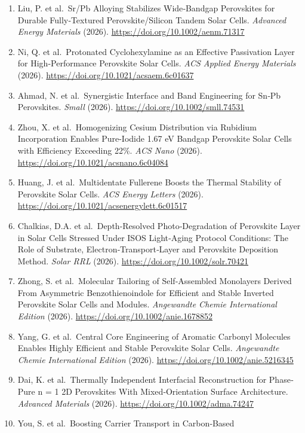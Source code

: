 \documentclass[
  11pt,
]{article}
\begin{document}
\begin{enumerate}
  \url{https://doi.org/10.1002/anie.7827890}
\item
  Liu, P. et al.~Sr/Pb Alloying Stabilizes Wide‐Bandgap Perovskites for
  Durable Fully‐Textured Perovskite/Silicon Tandem Solar Cells.
  \emph{Advanced Energy Materials} (2026).
  \url{https://doi.org/10.1002/aenm.71317}
\item
  Ni, Q. et al.~Protonated Cyclohexylamine as an Effective Passivation
  Layer for High-Performance Perovskite Solar Cells. \emph{ACS Applied
  Energy Materials} (2026). \url{https://doi.org/10.1021/acsaem.6c01637}
\item
  Ahmad, N. et al.~Synergistic Interface and Band Engineering for Sn‐Pb
  Perovskites. \emph{Small} (2026).
  \url{https://doi.org/10.1002/smll.74531}
\item
  Zhou, X. et al.~Homogenizing Cesium Distribution via Rubidium
  Incorporation Enables Pure-Iodide 1.67 eV Bandgap Perovskite Solar
  Cells with Efficiency Exceeding 22\%. \emph{ACS Nano} (2026).
  \url{https://doi.org/10.1021/acsnano.6c04084}
\item
  Huang, J. et al.~Multidentate Fullerene Boosts the Thermal Stability
  of Perovskite Solar Cells. \emph{ACS Energy Letters} (2026).
  \url{https://doi.org/10.1021/acsenergylett.6c01517}
\item
  Chalkias, D.A. et al.~Depth‐Resolved Photo‐Degradation of Perovskite
  Layer in Solar Cells Stressed Under ISOS Light‐Aging Protocol
  Conditions: The Role of Substrate, Electron‐Transport‐Layer and
  Perovskite Deposition Method. \emph{Solar RRL} (2026).
  \url{https://doi.org/10.1002/solr.70421}
\item
  Zhong, S. et al.~Molecular Tailoring of Self‐Assembled Monolayers
  Derived From Asymmetric Benzothienoindole for Efficient and Stable
  Inverted Perovskite Solar Cells and Modules. \emph{Angewandte Chemie
  International Edition} (2026).
  \url{https://doi.org/10.1002/anie.1678852}
\item
  Yang, G. et al.~Central Core Engineering of Aromatic Carbonyl
  Molecules Enables Highly Efficient and Stable Perovskite Solar Cells.
  \emph{Angewandte Chemie International Edition} (2026).
  \url{https://doi.org/10.1002/anie.5216345}
\item
  Dai, K. et al.~Thermally Independent Interfacial Reconstruction for
  Phase‐Pure n = 1 2D Perovskites With Mixed‐Orientation Surface
  Architecture. \emph{Advanced Materials} (2026).
  \url{https://doi.org/10.1002/adma.74247}
\item
  You, S. et al.~Boosting Carrier Transport in Carbon‐Based

\end{enumerate}
\end{document}
